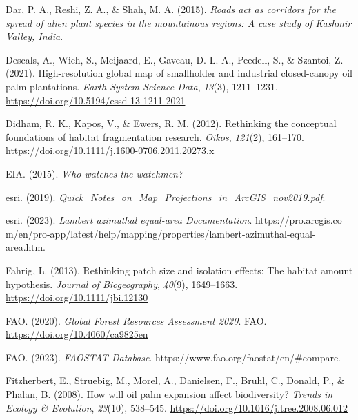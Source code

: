\documentclass[
  letterpaper,
  DIV=11,
  numbers=noendperiod]{scrreprt}
\newlength{\cslhangindent}
\newlength{\cslentryspacingunit} %
\newenvironment{CSLReferences}[2] %
 {%
  \setlength{\parindent}{0pt}
  \ifodd #1
  \let\oldpar\par
  \def\par{\hangindent=\cslhangindent\oldpar}
  \fi
  \setlength{\parskip}{#2\cslentryspacingunit}
 }%
 {}
\begin{document}
\begin{CSLReferences}{1}{0}
\leavevmode{}%
Dar, P. A., Reshi, Z. A., \& Shah, M. A. (2015). \emph{Roads act as
corridors for the spread of alien plant species in the mountainous
regions: {A} case study of {Kashmir Valley}, {India}}.

\leavevmode{}%
Descals, A., Wich, S., Meijaard, E., Gaveau, D. L. A., Peedell, S., \&
Szantoi, Z. (2021). High-resolution global map of smallholder and
industrial closed-canopy oil palm plantations. \emph{Earth System
Science Data}, \emph{13}(3), 1211--1231.
\url{https://doi.org/10.5194/essd-13-1211-2021}

\leavevmode{}%
Didham, R. K., Kapos, V., \& Ewers, R. M. (2012). Rethinking the
conceptual foundations of habitat fragmentation research. \emph{Oikos},
\emph{121}(2), 161--170.
\url{https://doi.org/10.1111/j.1600-0706.2011.20273.x}

\leavevmode{}%
EIA. (2015). \emph{Who watches the watchmen?}

\leavevmode{}%
esri. (2019).
\emph{Quick\_{Notes}\_on\_{Map}\_{Projections}\_in\_{ArcGIS}\_nov2019.pdf}.

\leavevmode{}%
esri. (2023). \emph{Lambert azimuthal
equal-area \textbar{} {Documentation}}.
https://pro.arcgis.co
m/en/pro-app/latest/help/mapping/properties/lambert-azimuthal-equal-area.htm.

\leavevmode{}%
Fahrig, L. (2013). Rethinking patch size and isolation effects: The
habitat amount hypothesis. \emph{Journal of Biogeography}, \emph{40}(9),
1649--1663. \url{https://doi.org/10.1111/jbi.12130}

\leavevmode{}%
FAO. (2020). \emph{Global {Forest Resources Assessment} 2020}. {FAO}.
\url{https://doi.org/10.4060/ca9825en}

\leavevmode{}%
FAO. (2023). \emph{{FAOSTAT Database}}.
https://www.fao.org/faostat/en/\#compare.

\leavevmode{}%
Fitzherbert, E., Struebig, M., Morel, A., Danielsen, F., Bruhl, C.,
Donald, P., \& Phalan, B. (2008). How will oil palm expansion affect
biodiversity? \emph{Trends in Ecology \& Evolution}, \emph{23}(10),
538--545. \url{https://doi.org/10.1016/j.tree.2008.06.012}


\end{CSLReferences}
\end{document}
